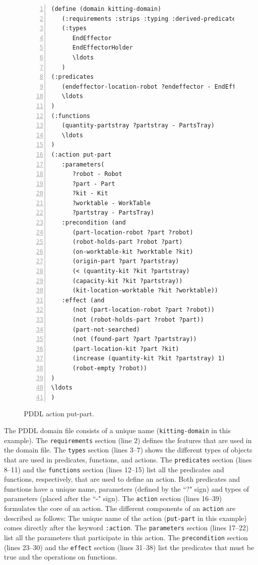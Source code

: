 \begin{figure}[t!h!]
\centering
\begin{minipage}{.5\paperwidth}
\begin{list}{}{\setlength{\leftmargin}{1em}}\item\small
\begin{Verbatim}[commandchars=\\\{\},fontsize=\scriptsize, numbers=left, numbersep=2pt]
(define (domain kitting-domain)
   (:requirements :strips :typing :derived-predicates :action-costs :fluents)
   (:types
      EndEffector
      EndEffectorHolder
      \ldots
   )
(:predicates
   (endeffector-location-robot ?endeffector - EndEffector ?robot - Robot)	
   \ldots
)
(:functions
   (quantity-partstray ?partstray - PartsTray)
   \ldots
)
(:action put-part
   :parameters(
      ?robot - Robot
      ?part - Part
      ?kit - Kit
      ?worktable - WorkTable
      ?partstray - PartsTray)
   :precondition (and
      (part-location-robot ?part ?robot)
      (robot-holds-part ?robot ?part)
      (on-worktable-kit ?worktable ?kit)
      (origin-part ?part ?partstray)
      (< (quantity-kit ?kit ?partstray)
      (capacity-kit ?kit ?partstray))
      (kit-location-worktable ?kit ?worktable))
   :effect (and
      (not (part-location-robot ?part ?robot))
      (not (robot-holds-part ?robot ?part))
      (part-not-searched)
      (not (found-part ?part ?partstray))
      (part-location-kit ?part ?kit)
      (increase (quantity-kit ?kit ?partstray) 1)
      (robot-empty ?robot))
)
\ldots
)
\end{Verbatim}
\end{list}
\end{minipage}
\caption{PDDL action put-part.}
\label{fig:put-part}
\end{figure}
The PDDL domain file consists of a unique name (\texttt{kitting-domain} in this example). The \texttt{requirements} section (line 2) defines the features that are used in the domain file. The \texttt{types} section (lines 3--7) shows the different types of objects that are used in predicates, functions, and actions. The \texttt{predicates} section (lines 8--11) and the \texttt{functions} section (lines 12--15) list all the predicates and functions, respectively, that are used to define an action. Both predicates and functions have a unique name, parameters (defined by the ``?" sign) and types of parameters (placed after the ``-" sign). The \texttt{action} section (lines 16--39) formulates the core of an action. The different components of an \texttt{action} are described as follows: The unique name of the action (\texttt{put-part} in this example) comes directly after the keyword \texttt{:action}. The \texttt{parameters} section (lines 17--22) list all the parameters that participate in this action. The \texttt{precondition} section (lines 23--30) and the \texttt{effect} section (lines 31--38) list the predicates that must be true and the operations on functions.

